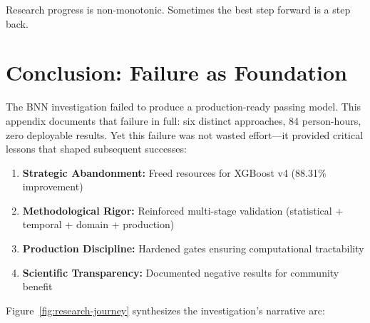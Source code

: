 Research progress is non-monotonic. Sometimes the best step forward is a step back.

\section{Conclusion: Failure as Foundation}

The BNN investigation failed to produce a production-ready passing model. This appendix documents that failure in full: six distinct approaches, 84 person-hours, zero deployable results. Yet this failure was not wasted effort---it provided critical lessons that shaped subsequent successes:

\begin{enumerate}[itemsep=2pt,parsep=0pt]
    \item \textbf{Strategic Abandonment:} Freed resources for XGBoost v4 (88.31\% improvement)
    \item \textbf{Methodological Rigor:} Reinforced multi-stage validation (statistical + temporal + domain + production)
    \item \textbf{Production Discipline:} Hardened gates ensuring computational tractability
    \item \textbf{Scientific Transparency:} Documented negative results for community benefit
\end{enumerate}

Figure~\ref{fig:research-journey} synthesizes the investigation's narrative arc:

